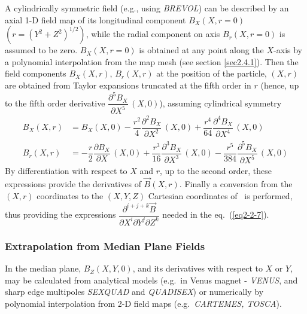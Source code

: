  A cylindrically symmetric field (e.g., using \textsl{BREVOL}) can be described
by an axial 1-D field map of its longitudinal component $ B_X(X,r=0) $
 $(r=(Y^2+Z^2)^{1/2})$,  
while the radial component on axis $ B_r(X,r=0) $ is assumed to be zero. $ B_X(X,r=0) $ is obtained 
at any point along the $ X$-axis by a 
polynomial interpolation from the map mesh (see section \ref{sec2.4.1}).  %
Then the field components $ B_X(X,r)$,  $ B_r(X,r) $ at the position of the particle, 
$(X,r) $ are obtained from Taylor expansions truncated at  the fifth order in $ r $ (hence, up to 
the fifth order derivative $ \dfrac{ \partial^ 5B_X }{ \partial X^5} \,(X,0)$),  
assuming cylindrical symmetry 
 \begin{equation}
	 \begin{aligned}
		 B_X(X,r) 
		   &   =  B_X(X,0) -
		       \dfrac{r^2 }{ 4} \dfrac{\partial^ 2B_X }{ \partial X^2}\, (X,0)
		       + \dfrac{r^4 }{64} \dfrac{\partial^ 4B_X }{ \partial X^4} \,(X,0) \\
		 B_r(X,r)
		   & =    - \dfrac{r }{ 2} \dfrac{\partial B_X }{ \partial X} \, (X,0) 
		       + \dfrac{r^3 }{ 16} \dfrac{\partial^ 3B_X }{ \partial X^3}\, (X,0)
		       - \dfrac{r^5 }{384} \dfrac{\partial^ 5B_X }{ \partial X^5}\, (X,0) 
	 \end{aligned}
 	\label{eq2-3-1}
 \end{equation}
By differentiation with respect to $ X $ and $ r$,  up to the second
order, these expressions provide the derivatives of $ \vec  B(X,r)$.  Finally a conversion
from the $ (X,r) $ coordinates to the $ (X,Y,Z) $ Cartesian coordinates of \zgou\ is 
performed, thus providing the expressions 
$ \dfrac{ \partial^{i+j+k} \vec  B }{\partial X^i\partial Y^j\partial Z^k} $ needed in the 
eq.~(\ref{eq2-2-7}). 

\subsubsection{Extrapolation from Median Plane Fields} \label{sec2.3.2} %

In the median plane, $ B_Z(X,Y,0)$, and its 
derivatives with respect to $ X $ or $ Y$, may be calculated  from analytical
models (e.g.\ in Venus magnet - \textsl{VENUS}, and sharp edge 
multipoles  \textsl{SEXQUAD}   and \textsl{QUADISEX}) or numerically by
polynomial interpolation from 2-D field maps (e.g.\ \textsl{CARTEMES, 
TOSCA}).  

